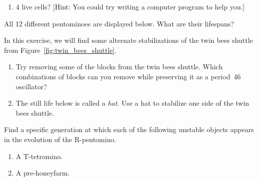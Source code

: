 \begin{multicols}{2}
\begin{problem}
\begin{enumerate}[label=\bf\color{ocre}(\alph*)]
	\item $4$ live cells? [Hint: You could try writing a computer program to help you.]
\end{enumerate}
\end{problem}


\mfilbreak


\begin{problem}\label{exer:pentominoes}
All 12 different pentominoes are displayed below. What are their lifespans?

\begin{center}
\end{center}
\end{problem}


\mfilbreak


\begin{problem}\label{exer:twin_bees_stabilize}
In this exercise, we will find some alternate stabilizations of the twin bees shuttle from Figure~\ref{fig:twin_bees_shuttle}.\smallskip

\begin{enumerate}[label=\bf\color{ocre}(\alph*)]
	\item Try removing some of the blocks from the twin bees shuttle. Which combinations of blocks can you remove while preserving it as a period~46 oscillator?
	
	\item The still life below is called a \emph{hat}. Use a hat to stabilize one side of the twin bees shuttle.
	\begin{center}
	\end{center}
\end{enumerate}
\end{problem}


\mfilbreak


\begin{problemstar}\label{exer:find_unstable}
Find a specific generation at which each of the following unstable objects appears in the evolution of the R-pentomino.\smallskip

\begin{enumerate}[label=\bf\color{ocre}(\alph*)]
	\item A T-tetromino.
	
	\item A pre-honeyfarm.
	

\end{enumerate}
\end{problemstar}
\end{multicols}

